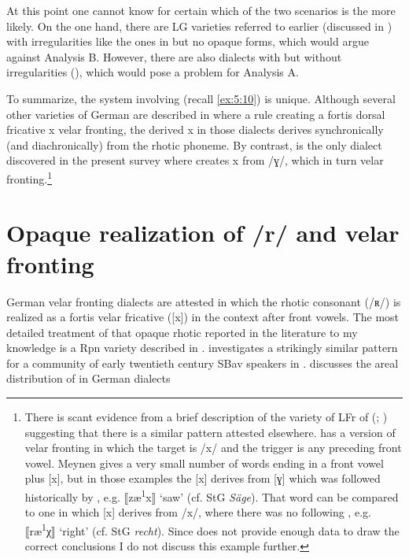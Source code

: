 At this point one cannot know for certain which of the two scenarios is the more likely. On the one hand, there are LG varieties referred to earlier (discussed in ) with irregularities like the ones in  but no opaque forms, which would argue against Analysis B. However, there are also dialects with  but without irregularities (), which would pose a problem for Analysis A.

To summarize, the  system involving   (recall \ref{ex:5:10}) is unique. Although several other varieties of German are described in  where a rule creating a fortis dorsal fricative {\textbar}x{\textbar}  velar fronting, the derived {\textbar}x{\textbar} in those dialects derives synchronically (and diachronically) from the rhotic phoneme. By contrast,  is the only dialect discovered in the present survey where  creates {\textbar}x{\textbar} from /ɣ/, which in turn  velar fronting.\footnote{{There is scant evidence from a brief description of the variety of LFr of  (\citealt{Meynen1911}; ) suggesting that there is a similar pattern attested elsewhere.  has a version of velar fronting in which the target is /x/ and the trigger is any preceding front vowel. Meynen gives a very small number of words ending in a front vowel plus [x], but in those examples the [x] derives from [ɣ] which was followed historically by , e.g. ⟦zæ}\textrm{\textsuperscript{1}}\textrm{x⟧ ‘saw’ (cf. StG} \textrm{\textit{Säge}}\textrm{). That word can be compared to one in which [x] derives from /x/, where there was no following , e.g. ⟦ræ}\textrm{\textsuperscript{1}}\textrm{χ⟧ ‘right’ (cf. StG} \textrm{\textit{recht}}\textrm{). Since \citet{Meynen1911} does not provide enough data to draw the correct conclusions I do not discuss this example further.}}

\section{Opaque realization of /r/ and velar fronting}\label{sec:5.3}

German velar fronting dialects are attested in which the rhotic consonant (/ʀ/) is realized as a fortis velar fricative ([x]) in the context after front vowels. The most detailed treatment of that opaque rhotic reported in the literature to my knowledge is a Rpn variety described in .  investigates a strikingly similar pattern for a community of early twentieth century SBav speakers in .  discusses the areal distribution of   in German dialects

